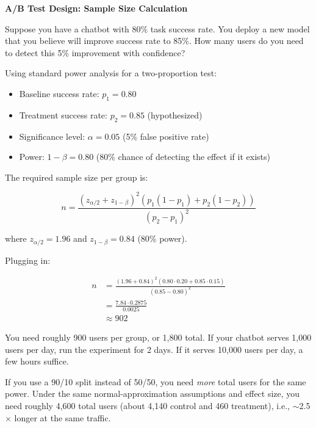 \begin{examplebox}
\textbf{A/B Test Design: Sample Size Calculation}

\vspace{0.5em}

Suppose you have a chatbot with 80\% task success rate. You deploy a new model that you believe will improve success rate to 85\%. How many users do you need to detect this 5\% improvement with confidence?

\vspace{0.5em}

Using standard power analysis for a two-proportion test:

\begin{itemize}
\item Baseline success rate: $p_1 = 0.80$
\item Treatment success rate: $p_2 = 0.85$ (hypothesized)
\item Significance level: $\alpha = 0.05$ (5\% false positive rate)
\item Power: $1 - \beta = 0.80$ (80\% chance of detecting the effect if it exists)
\end{itemize}

The required sample size per group is:

\begin{equation}
n = \frac{(z_{\alpha/2} + z_{1-\beta})^2 (p_1(1-p_1) + p_2(1-p_2))}{(p_2 - p_1)^2}
\end{equation}

where $z_{\alpha/2} = 1.96$ and $z_{1-\beta} = 0.84$ (80\% power).

\vspace{0.3em}

Plugging in:

\begin{align}
n &= \frac{(1.96 + 0.84)^2 (0.80 \cdot 0.20 + 0.85 \cdot 0.15)}{(0.85 - 0.80)^2} \\
  &= \frac{7.84 \cdot 0.2875}{0.0025} \\
  &\approx 902
\end{align}

\vspace{0.5em}

You need roughly 900 users per group, or 1,800 total. If your chatbot serves 1,000 users per day, run the experiment for 2 days. If it serves 10,000 users per day, a few hours suffice.

\vspace{0.5em}

If you use a 90/10 split instead of 50/50, you need \emph{more} total users for the same power. Under the same normal-approximation assumptions and effect size, you need roughly 4,600 total users (about 4,140 control and 460 treatment), i.e., $\sim$2.5$\times$ longer at the same traffic.
\end{examplebox}

